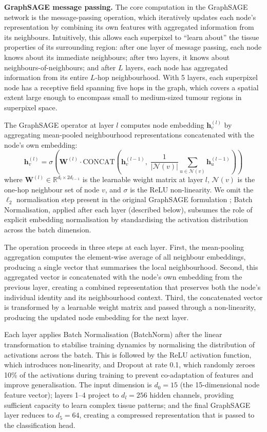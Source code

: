 \documentclass{article}
\begin{document}
\textbf{GraphSAGE message passing.}
The core computation in the GraphSAGE network is the message-passing operation,
which iteratively updates each node's representation by combining its own features
with aggregated information from its neighbours. Intuitively, this allows each
superpixel to ``learn about'' the tissue properties of its surrounding region: after
one layer of message passing, each node knows about its immediate neighbours; after
two layers, it knows about neighbours-of-neighbours; and after $L$ layers, each
node has aggregated information from its entire $L$-hop neighbourhood. With 5 layers,
each superpixel node has a receptive field spanning five hops in the graph, which
covers a spatial extent large enough to encompass small to medium-sized tumour
regions in superpixel space.

The GraphSAGE operator \cite{hamilton2017graphsage} at layer $l$ computes node
embedding $\mathbf{h}_v^{(l)}$ by aggregating mean-pooled neighbourhood
representations concatenated with the node's own embedding:
\[
    \mathbf{h}_v^{(l)} = \sigma\!\left(
        \mathbf{W}^{(l)} \cdot \mathrm{CONCAT}\!\left(
            \mathbf{h}_v^{(l-1)},\;
            \frac{1}{|\mathcal{N}(v)|}
            \sum_{u \in \mathcal{N}(v)} \mathbf{h}_u^{(l-1)}
        \right)
    \right)
\]
where $\mathbf{W}^{(l)} \in \mathbb{R}^{d_l \times 2d_{l-1}}$ is the learnable
weight matrix at layer $l$, $\mathcal{N}(v)$ is the one-hop neighbour set of node
$v$, and $\sigma$ is the ReLU non-linearity. We omit the $\ell_2$ normalisation
step present in the original GraphSAGE formulation \cite{hamilton2017graphsage};
Batch Normalisation, applied after each layer (described below), subsumes the role
of explicit embedding normalisation by standardising the activation distribution
across the batch dimension.

The operation proceeds in three steps at each layer. First, the mean-pooling
aggregation computes the element-wise average of all neighbour embeddings, producing
a single vector that summarises the local neighbourhood. Second, this aggregated
vector is concatenated with the node's own embedding from the previous layer,
creating a combined representation that preserves both the node's individual
identity and its neighbourhood context. Third, the concatenated vector is
transformed by a learnable weight matrix and passed through a non-linearity,
producing the updated node embedding for the next layer.

Each layer applies Batch Normalisation (BatchNorm) after the linear transformation
to stabilise training dynamics by normalising the distribution of activations across
the batch. This is followed by the ReLU activation function, which introduces
non-linearity, and Dropout at rate 0.1, which randomly zeroes 10\% of the
activations during training to prevent co-adaptation of features and improve
generalisation. The input dimension is $d_0 = 15$ (the 15-dimensional node feature
vector); layers 1--4 project to $d_l = 256$ hidden channels, providing sufficient
capacity to learn complex tissue patterns; and the final GraphSAGE layer reduces to
$d_5 = 64$, creating a compressed representation that is passed to the classification
head.
\end{document}
